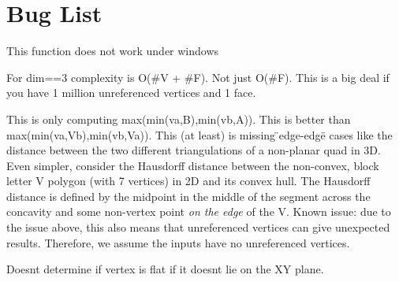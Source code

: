 \chapter{Bug List}
\hypertarget{bug}{}\label{bug}

\begin{DoxyRefList}
\item[Member \doxylink{namespaceigl_a73748b03f3e779d764d30d920653aba6}{igl\+::dated\+\_\+copy} (const std\+::string \&src\+\_\+path, const std\+::string \&dir)]\label{bug__bug000001}%
%
This function does not work under windows  
\item[Member \doxylink{namespaceigl_a7bae61a0f8a1bbe72e7832381c9beca5}{igl\+::doublearea} (const Eigen\+::\+Matrix\+Base$<$ Derived\+V $>$ \&V, const Eigen\+::\+Matrix\+Base$<$ Derived\+F $>$ \&F, Eigen\+::\+Plain\+Object\+Base$<$ Deriveddbl\+A $>$ \&dblA)]\label{bug__bug000002}%
%
For dim==3 complexity is O(\#V + \#F). Not just O(\#F). This is a big deal if you have 1 million unreferenced vertices and 1 face.  
\item[Member \doxylink{namespaceigl_a64901d7f496bd1cccbccceddbc091603}{igl\+::hausdorff} (const Eigen\+::\+Matrix\+Base$<$ Derived\+VA $>$ \&VA, const Eigen\+::\+Matrix\+Base$<$ Derived\+FA $>$ \&FA, const Eigen\+::\+Matrix\+Base$<$ Derived\+VB $>$ \&VB, const Eigen\+::\+Matrix\+Base$<$ Derived\+FB $>$ \&FB, Scalar \&d)]\label{bug__bug000003}%
%
This is only computing max(min(va,\+B),min(vb,\+A)). This is better than max(min(va,\+Vb),min(vb,\+Va)). This (at least) is missing \"{}edge-\/edge\"{} cases like the distance between the two different triangulations of a non-\/planar quad in 3D. Even simpler, consider the Hausdorff distance between the non-\/convex, block letter V polygon (with 7 vertices) in 2D and its convex hull. The Hausdorff distance is defined by the midpoint in the middle of the segment across the concavity and some non-\/vertex point {\itshape on the edge} of the V. Known issue\+: due to the issue above, this also means that unreferenced vertices can give unexpected results. Therefore, we assume the inputs have no unreferenced vertices. 
\item[Member \doxylink{namespaceigl_aedd09a46e564a0d19ae4f97891b95de9}{igl\+::is\+\_\+planar} (const Eigen\+::\+Matrix\+Xd \&V)]\label{bug__bug000004}%
%
Doesn\textquotesingle{}t determine if vertex is flat if it doesn\textquotesingle{}t lie on the XY plane.  
\item[Class \doxylink{classigl_1_1matlab_1_1MatlabWorkspace}{igl\+::matlab\+::Matlab\+Workspace} ]\label{bug__bug000005}%

\end{DoxyRefList}
